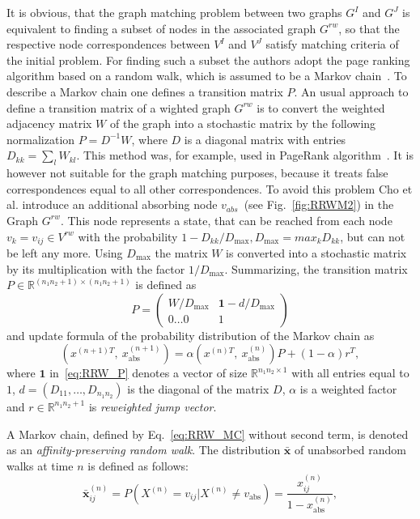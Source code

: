 It is obvious, that the graph matching problem between two graphs $G^I$ and $G^J$ is equivalent to finding a subset of nodes in the associated graph $G^{rw}$, so that the respective node correspondences between $V^I$ and $V^J$ satisfy matching criteria of the initial problem.
For finding such a subset the authors adopt the page ranking algorithm based on a random walk, which is assumed to be a Markov chain~\cite{PageRank}. To describe a Markov chain one defines a transition matrix $P$. An usual approach to define a transition matrix of a wighted graph $G^{rw}$ is to convert the weighted adjacency matrix $W$ of the graph into a stochastic matrix by the following normalization $P=D^{-1}W$, where $D$ is a diagonal matrix with entries $D_{kk}=\sum_{l}{W_{kl}}$. This method was, for example, used in PageRank algorithm~\cite{PageRank}. It is however not suitable for the graph matching purposes, because it treats false correspondences equal to all other correspondences. To avoid this problem Cho et al. introduce an additional absorbing node $v_{abs}$~(see Fig.~\ref{fig:RRWM2}) in the Graph $G^{rw}$. This node represents a state, that can be reached from each node $v_k=v_{ij}\in V^{rw}$ with the probability $1-D_{kk}/D_{\text{max}}, D_{\text{max}}=max_{k}D_{kk}$, but can not be left any more. Using $D_\text{max}$ the matrix $W$ is converted into a stochastic matrix by its multiplication with the factor $1/D_{\text{max}}$.
Summarizing, the transition matrix $P\in\mathbb{R}^{(n_1n_2+1)\times(n_1n_2+1)}$ is defined as 
\begin{equation}P=
\begin{pmatrix}
W/D_{\text{max}} & \mathbf{1}-d/D_{\text{max}} \\
0\dots 0 & 1
\end{pmatrix} \label{eq:RRW_P}
\end{equation}
and update formula of the probability distribution of the Markov chain as
\begin{equation}\label{eq:RRW_MC}
\left(x^{(n+1)T},\ x_{\text{abs}}^{(n+1)}\right)=\alpha\left(x^{(n)T},\ x_{\text{abs}}^{(n)}\right)P+(1-\alpha)r^T,
\end{equation}
where $\mathbf{1}$ in~\eqref{eq:RRW_P} denotes a vector of size $\mathbb{R}^{n_1n_2\times 1}$ with all entries equal to $1$, $d=(D_{11},\dots,D_{n_1n_2})$ is the diagonal of the matrix $D$, $\alpha$ is a weighted factor and $r\in\mathbb{R}^{n_1n_2+1}$ is \emph{reweighted jump vector}.

A Markov chain, defined by Eq.~\ref{eq:RRW_MC} without second term, is denoted as an \emph{affinity-preserving random walk}. The distribution $\mathbf{\bar{x}}$ of unabsorbed random walks at time $n$ is defined as follows:
\begin{equation}\label{eq:RRWM_x}
\mathbf{\bar{x}}^{(n)}_{ij}=P(X^{(n)}=v_{ij}|X^{(n)}\not=v_{\text{abs}})=\frac{x^{(n)}_{ij}}{1-x^{(n)}_{\text{abs}}}, 
\end{equation}

